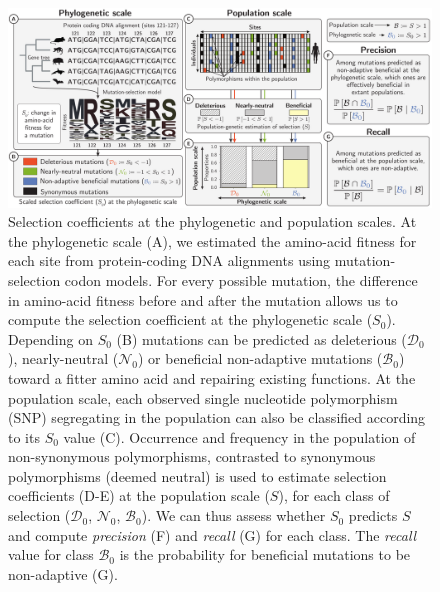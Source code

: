 \documentclass{article}
\newcommand{\Sphy}{S_{0}}
\newcommand{\SphyDel}{\mathcal{D}_0}
\newcommand{\SphyNeu}{\mathcal{N}_0}
\newcommand{\SphyBen}{\mathcal{B}_0}
\newcommand{\Spop}{S}
\begin{document}
    \begin{figure}[!h]
        \centering
        \includegraphics[width=\textwidth, page=1] {artworks/figure.method.proba}
        \caption{
            Selection coefficients at the phylogenetic and population scales.
            At the phylogenetic scale (A), we estimated the amino-acid fitness for each site from protein-coding DNA alignments using mutation-selection codon models.
            For every possible mutation, the difference in amino-acid fitness before and after the mutation allows us to compute the selection coefficient at the phylogenetic scale ($\Sphy$).
            Depending on $\Sphy$ (B) mutations can be predicted as deleterious ($\SphyDel$), nearly-neutral ($\SphyNeu$) or beneficial non-adaptive mutations ($\SphyBen$) toward a fitter amino acid and repairing existing functions.
            At the population scale, each observed single nucleotide polymorphism (SNP) segregating in the population can also be classified according to its $\Sphy$ value (C).
            Occurrence and frequency in the population of non-synonymous polymorphisms, contrasted to synonymous polymorphisms (deemed neutral) is used to estimate selection coefficients (D-E) at the population scale ($\Spop$), for each class of selection ($\SphyDel$, $\SphyNeu$, $\SphyBen$).
            We can thus assess whether $\Sphy$ predicts $\Spop$ and compute \textit{precision} (F) and \textit{recall} (G) for each class.
            The \textit{recall} value for class $\SphyBen$ is the probability for beneficial mutations to be non-adaptive (G).
        }
        \label{fig:method}
    \end{figure}
\end{document}

